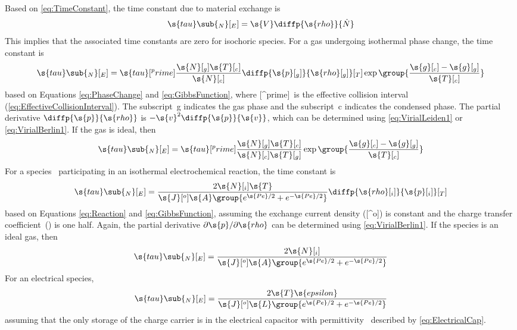 Based on \autoref{eq:TimeConstant}, the time constant due to material exchange is
\begin{equation}
  \s{tau}\sub{_N}[_E] = \s{V}\diffp{\s{rho}}{\dot{N}}
\end{equation}
This implies that the associated time constants are zero for isochoric species.  For a gas undergoing isothermal phase change, the time constant is
\begin{equation}
  \s{tau}\sub{_N}[_E] = \s{tau}[^prime]\frac{\s{N}[_g]\s{T}[_c]}{\s{N}[_c]}\diffp{\s{p}[_g]}{\s{rho}[_g]}[_T]\exp\group{\frac{\s{g}[_c] - \s{g}[_g]}{\s{T}[_c]}}
\end{equation}
based on Equations \ref{eq:PhaseChange} and \ref{eq:GibbsFunction}, where [^prime]~is the effective collision interval (\autoref{eq:EffectiveCollisionInterval}).  The subscript~g indicates the gas phase and the subscript~c indicates the condensed phase.  The partial derivative $\diffp{\s{p}}{\s{rho}}$ is $-\s{v}^2\diffp{\s{p}}{\s{v}}$, which can be determined using \autoref{eq:VirialLeiden1} or \ref{eq:VirialBerlin1}.  If the gas is ideal, then
\begin{equation}
  \s{tau}\sub{_N}[_E] = \s{tau}[^prime]\frac{\s{N}[_g]\s{T}[_c]}{\s{N}[_c]\s{T}[_g]}\exp\group{\frac{\s{g}[_c] - \s{g}[_g]}{\s{T}[_c]}}
\end{equation}
For a species~ participating in an isothermal electrochemical reaction, the time constant is
\begin{equation}
  \s{tau}\sub{_N}[_E] = \frac{2\s{N}[_i]\s{T}}{\s{J}[^o]\s{A}\group{e^{\s{Pe}/2} + e^{-\s{Pe}/2}}}\diffp{\s{rho}[_i]}{\s{p}[_i]}[_T]
\end{equation}
based on Equations \ref{eq:Reaction} and \ref{eq:GibbsFunction}, assuming the exchange current density ([^o]) is constant and the charge transfer coefficient~() is one half.  Again, the partial derivative $\partial\s{p}/\partial\s{rho}$ can be determined using \autoref{eq:VirialBerlin1}.  If the species is an ideal gas, then
\begin{equation}
  \s{tau}\sub{_N}[_E] = \frac{2\s{N}[_i]}{\s{J}[^o]\s{A}\group{e^{\s{Pe}/2} + e^{-\s{Pe}/2}}}
\end{equation}
For an electrical species,
\begin{equation}
  \s{tau}\sub{_N}[_E] = \frac{2\s{T}\s{epsilon}}{\s{J}[^o]\s{L}\group{e^{\s{Pe}/2} + e^{-\s{Pe}/2}}}
\end{equation}
assuming that the only storage of the charge carrier is in the electrical capacitor with permittivity~ described by \autoref{eq:ElectricalCap}.


